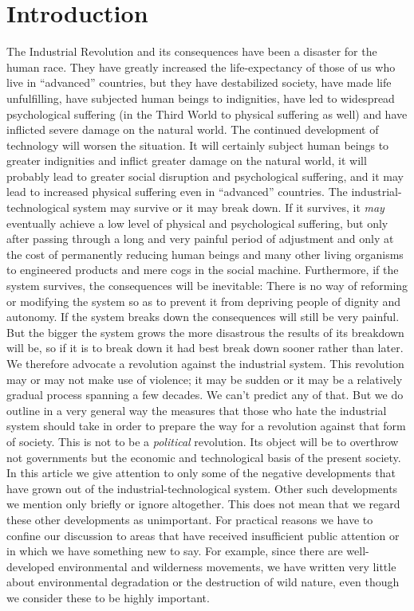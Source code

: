 \chapter{Introduction}

 The Industrial Revolution and its consequences have been a disaster for the human race. They have greatly increased the life-expectancy of those of us who live in “advanced” countries, but they have destabilized society, have made life unfulfilling, have subjected human beings to indignities, have led to widespread psychological suffering (in the Third World to physical suffering as well) and have inflicted severe damage on the natural world. The continued development of technology will worsen the situation. It will certainly subject human beings to greater indignities and inflict greater damage on the natural world, it will probably lead to greater social disruption and psychological suffering, and it may lead to increased physical suffering even in “advanced” countries.
 The industrial-technological system may survive or it may break down. If it survives, it {\em may} eventually achieve a low level of physical and psychological suffering, but only after passing through a long and very painful period of adjustment and only at the cost of permanently reducing human beings and many other living organisms to engineered products and mere cogs in the social machine. Furthermore, if the system survives, the consequences will be inevitable: There is no way of reforming or modifying the system so as to prevent it from depriving people of dignity and autonomy.
 If the system breaks down the consequences will still be very painful. But the bigger the system grows the more disastrous the results of its breakdown will be, so if it is to break down it had best break down sooner rather than later. 
 We therefore advocate a revolution against the industrial system. This revolution may or may not make use of violence; it may be sudden or it may be a relatively gradual process spanning a few decades. We can’t predict any of that. But we do outline in a very general way the measures that those who hate the industrial system should take in order to prepare the way for a revolution against that form of society. This is not to be a {\em political} revolution. Its object will be to overthrow not governments but the economic and technological basis of the present society. 
 In this article we give attention to only some of the negative developments that have grown out of the industrial-technological system. Other such developments we mention only briefly or ignore altogether. This does not mean that we regard these other developments as unimportant. For practical reasons we have to confine our discussion to areas that have received insufficient public attention or in which we have something new to say. For example, since there are well-developed environmental and wilderness movements, we have written very little about environmental degradation or the destruction of wild nature, even though we consider these to be highly important.

